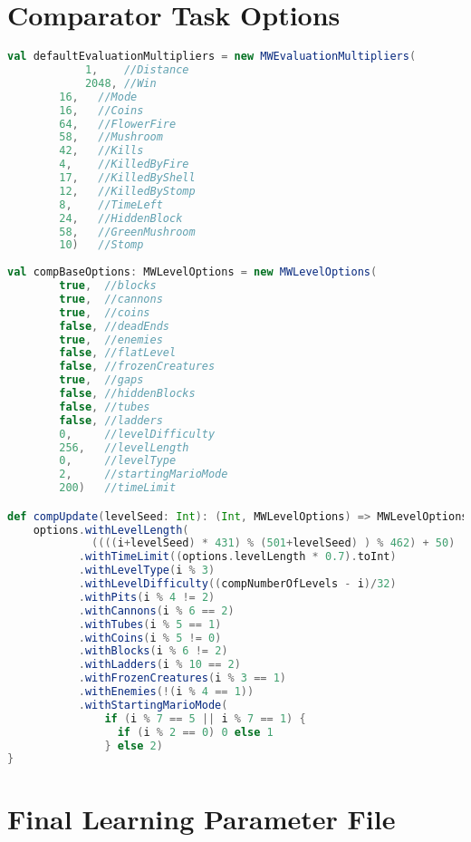 \section{Comparator Task Options}
\label{app:comptask}
\setcounter{lstlisting}{0}


\begin{minipage}{0.9\linewidth}
\begin{lstlisting}[language=scala, basicstyle=\scriptsize\ttfamily, caption=Parameter classes for the comparator task described in Section \ref{subsec:comptask}]
val defaultEvaluationMultipliers = new MWEvaluationMultipliers(
        	1,    //Distance
        	2048, //Win
		16,   //Mode
		16,   //Coins
		64,   //FlowerFire
		58,   //Mushroom
		42,   //Kills
		4,    //KilledByFire
		17,   //KilledByShell
		12,   //KilledByStomp
		8,    //TimeLeft
		24,   //HiddenBlock
		58,   //GreenMushroom
		10)   //Stomp
		
val compBaseOptions: MWLevelOptions = new MWLevelOptions(
		true,  //blocks
		true,  //cannons
		true,  //coins
		false, //deadEnds
		true,  //enemies
		false, //flatLevel
		false, //frozenCreatures
		true,  //gaps
		false, //hiddenBlocks
		false, //tubes
		false, //ladders
		0,     //levelDifficulty
		256,   //levelLength
		0,     //levelType
		2,     //startingMarioMode
		200)   //timeLimit

def compUpdate(levelSeed: Int): (Int, MWLevelOptions) => MWLevelOptions = (i: Int, options: MWLevelOptions) => {
    options.withLevelLength(
             ((((i+levelSeed) * 431) % (501+levelSeed) ) % 462) + 50)
           .withTimeLimit((options.levelLength * 0.7).toInt)
           .withLevelType(i % 3)
           .withLevelDifficulty((compNumberOfLevels - i)/32)
           .withPits(i % 4 != 2)
           .withCannons(i % 6 == 2)
           .withTubes(i % 5 == 1)
           .withCoins(i % 5 != 0)
           .withBlocks(i % 6 != 2)
           .withLadders(i % 10 == 2)
           .withFrozenCreatures(i % 3 == 1)
           .withEnemies(!(i % 4 == 1))
           .withStartingMarioMode(
               if (i % 7 == 5 || i % 7 == 1) {
                 if (i % 2 == 0) 0 else 1
               } else 2)
}
\end{lstlisting}
\end{minipage}


\section{Final Learning Parameter File}
\label{app:paramfile}

